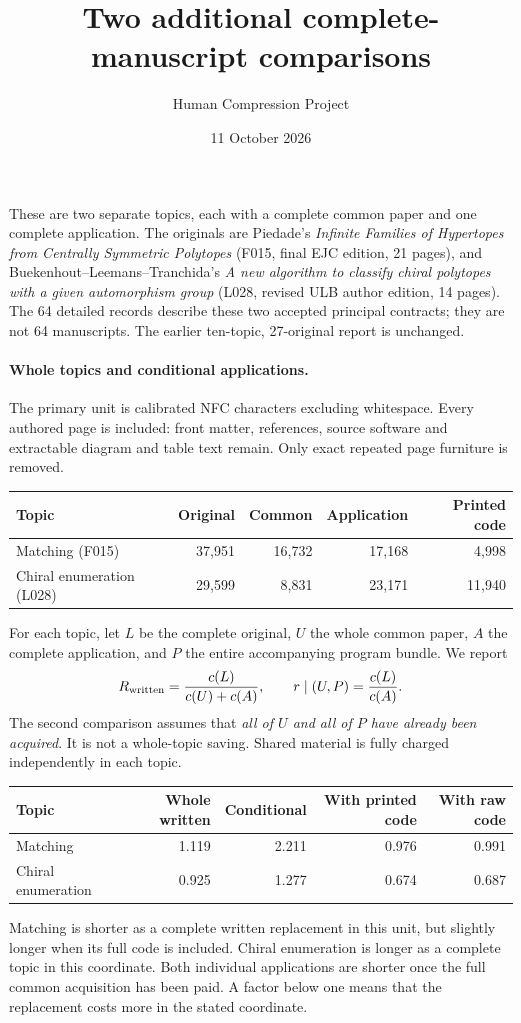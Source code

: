 \documentclass[11pt,a4paper]{article}
\title{Two additional complete-manuscript comparisons}
\author{Human Compression Project}\date{11 October 2026}
\begin{document}
\maketitle
These are two separate topics, each with a complete common paper and one complete application. The originals are Piedade's \emph{Infinite Families of Hypertopes from Centrally Symmetric Polytopes} (F015, final EJC edition, 21 pages), and Buekenhout--Leemans--Tranchida's \emph{A new algorithm to classify chiral polytopes with a given automorphism group} (L028, revised ULB author edition, 14 pages). The 64 detailed records describe these two accepted principal contracts; they are not 64 manuscripts. The earlier ten-topic, 27-original report is unchanged.

\paragraph{Whole topics and conditional applications.}
The primary unit is calibrated NFC characters excluding whitespace. Every authored page is included: front matter, references, source software and extractable diagram and table text remain. Only exact repeated page furniture is removed.
\begin{center}\begin{tabular}{lrrrr}\toprule
Topic & Original & Common & Application & Printed code\\\midrule
Matching (F015) & 37,951 & 16,732 & 17,168 & 4,998 \\
Chiral enumeration (L028) & 29,599 & 8,831 & 23,171 & 11,940 \\
\bottomrule\end{tabular}\end{center}
For each topic, let $L$ be the complete original, $U$ the whole common paper, $A$ the complete application, and $P$ the entire accompanying program bundle. We report
\[
 R_{\rm written}=\frac{c(L)}{c(U)+c(A)},\qquad
 r\mid(U,P)=\frac{c(L)}{c(A)}.
\]
The second comparison assumes that \emph{all of $U$ and all of $P$ have already been acquired}. It is not a whole-topic saving. Shared material is fully charged independently in each topic.
\begin{center}\begin{tabular}{lrrrr}\toprule
Topic & Whole written & Conditional & With printed code & With raw code\\\midrule
Matching & 1.119 & 2.211 & 0.976 & 0.991 \\
Chiral enumeration & 0.925 & 1.277 & 0.674 & 0.687 \\
\bottomrule\end{tabular}\end{center}
Matching is shorter as a complete written replacement in this unit, but slightly longer when its full code is included. Chiral enumeration is longer as a complete topic in this coordinate. Both individual applications are shorter once the full common acquisition has been paid. A factor below one means that the replacement costs more in the stated coordinate.
\end{document}
